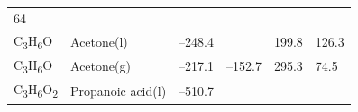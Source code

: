 \documentclass[
  9pt,
]{extbook}
\theoremstyle{definition}
\theoremstyle{definition}
\theoremstyle{definition}
\theoremstyle{remark}
\begin{document}
\begin{longtable}[]{@{}llllll@{}}
\begin{minipage}[t]{0.14\columnwidth}
64\strut
\end{minipage}\tabularnewline
\begin{minipage}[t]{0.07\columnwidth}\raggedright
C\textsubscript{3}H\textsubscript{6}O\strut
\end{minipage} & \begin{minipage}[t]{0.17\columnwidth}\raggedright
Acetone(l)\strut
\end{minipage} & \begin{minipage}[t]{0.15\columnwidth}\raggedright
--248.4\strut
\end{minipage} & \begin{minipage}[t]{0.15\columnwidth}\raggedright
\strut
\end{minipage} & \begin{minipage}[t]{0.14\columnwidth}\raggedright
199.8\strut
\end{minipage} & \begin{minipage}[t]{0.14\columnwidth}\raggedright
126.3\strut
\end{minipage}\tabularnewline
\begin{minipage}[t]{0.07\columnwidth}\raggedright
C\textsubscript{3}H\textsubscript{6}O\strut
\end{minipage} & \begin{minipage}[t]{0.17\columnwidth}\raggedright
Acetone(g)\strut
\end{minipage} & \begin{minipage}[t]{0.15\columnwidth}\raggedright
--217.1\strut
\end{minipage} & \begin{minipage}[t]{0.15\columnwidth}\raggedright
--152.7\strut
\end{minipage} & \begin{minipage}[t]{0.14\columnwidth}\raggedright
295.3\strut
\end{minipage} & \begin{minipage}[t]{0.14\columnwidth}\raggedright
74.5\strut
\end{minipage}\tabularnewline
\begin{minipage}[t]{0.07\columnwidth}\raggedright
C\textsubscript{3}H\textsubscript{6}O\textsubscript{2}\strut
\end{minipage} & \begin{minipage}[t]{0.17\columnwidth}\raggedright
Propanoic acid(l)\strut
\end{minipage} & \begin{minipage}[t]{0.15\columnwidth}\raggedright
--510.7\strut
\end{minipage} & \begin{minipage}[t]{0.15\columnwidth}\raggedright

\end{minipage}
\end{longtable}
\end{document}
